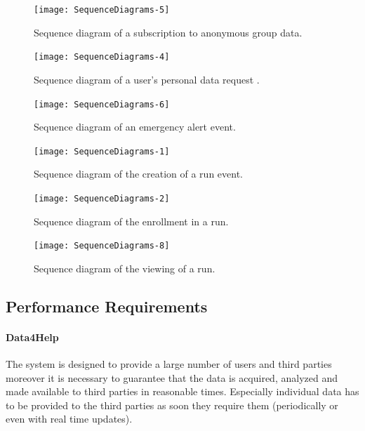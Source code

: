 \documentclass[a4paper]{article}
\begin{document}
\begin{figure}
    \centering
    \texttt{[image: SequenceDiagrams-5]}
    \caption{Sequence diagram of a subscription to anonymous group data.}
    \label{fig:my_label}
\end{figure}
\clearpage

\begin{figure}
    \centering
    \texttt{[image: SequenceDiagrams-4]}
    \caption{Sequence diagram of a user's personal data request .}
    \label{fig:my_label}
\end{figure}
\clearpage

\begin{figure}
    \centering
    \texttt{[image: SequenceDiagrams-6]}
    \caption{Sequence diagram of an emergency alert event.}
    \label{fig:my_label}
\end{figure}
\clearpage

\begin{figure}
    \centering
    \texttt{[image: SequenceDiagrams-1]}
    \caption{Sequence diagram of the creation of a run event.}
    \label{fig:my_label}
\end{figure}
\clearpage

\begin{figure}
    \centering
    \texttt{[image: SequenceDiagrams-2]}
    \caption{Sequence diagram of the enrollment in a run.}
    \label{fig:my_label}
\end{figure}
\clearpage

\begin{figure}
    \centering
    \texttt{[image: SequenceDiagrams-8]}
    \caption{Sequence diagram of the viewing of a run.}
    \label{fig:my_label}
\end{figure}
\clearpage

\subsection{Performance Requirements}

\paragraph{Data4Help} The system is designed to provide a large number of users and third parties moreover it is necessary to guarantee that the data is acquired, analyzed and made available to third parties in reasonable times. Especially individual data has to be provided to the third parties as soon they require them (periodically or even with real time updates).
\end{document}

